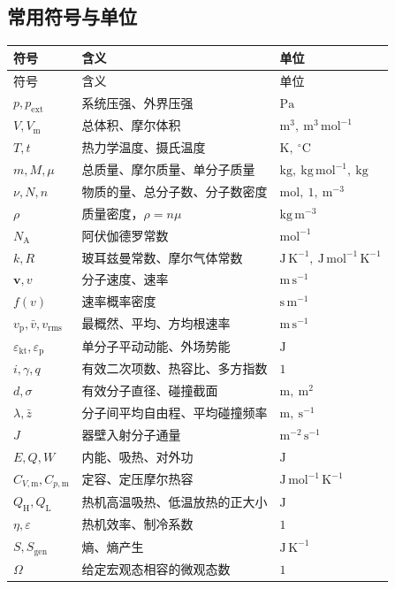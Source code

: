 \documentclass[UTF8,fontset=none,zihao=-4,a4paper]{ctexart}
\begin{document}
\subsection{常用符号与单位}
\small
\begin{longtable}{p{.17\linewidth} p{.47\linewidth} p{.24\linewidth}}
\toprule
符号 & 含义 & 单位\\
\midrule
\endfirsthead
\toprule
符号 & 含义 & 单位\\
\midrule
\endhead
\bottomrule
\endfoot
$p,p_{\mathrm{ext}}$ & 系统压强、外界压强 & $\mathrm{Pa}$\\
$V,V_{\mathrm m}$ & 总体积、摩尔体积 & $\mathrm{m^3},\ \mathrm{m^3\,mol^{-1}}$\\
$T,t$ & 热力学温度、摄氏温度 & $\mathrm K,\ {}^\circ\mathrm C$\\
$m,M,\mu$ & 总质量、摩尔质量、单分子质量 & $\mathrm{kg},\ \mathrm{kg\,mol^{-1}},\ \mathrm{kg}$\\
$\nu,N,n$ & 物质的量、总分子数、分子数密度 & $\mathrm{mol},\ 1,\ \mathrm{m^{-3}}$\\
$\rho$ & 质量密度，$\rho=n\mu$ & $\mathrm{kg\,m^{-3}}$\\
$N_{\mathrm A}$ & 阿伏伽德罗常数 & $\mathrm{mol^{-1}}$\\
$k,R$ & 玻耳兹曼常数、摩尔气体常数 & $\mathrm{J\,K^{-1}},\ \mathrm{J\,mol^{-1}\,K^{-1}}$\\
$\symbf v,v$ & 分子速度、速率 & $\mathrm{m\,s^{-1}}$\\
$f(v)$ & 速率概率密度 & $\mathrm{s\,m^{-1}}$\\
$v_{\mathrm p},\bar v,v_{\mathrm{rms}}$ & 最概然、平均、方均根速率 & $\mathrm{m\,s^{-1}}$\\
$\varepsilon_{\mathrm{kt}},\varepsilon_{\mathrm p}$ & 单分子平动动能、外场势能 & $\mathrm J$\\
$i,\gamma,q$ & 有效二次项数、热容比、多方指数 & $1$\\
$d,\sigma$ & 有效分子直径、碰撞截面 & $\mathrm m,\ \mathrm{m^2}$\\
$\lambda,\bar z$ & 分子间平均自由程、平均碰撞频率 & $\mathrm m,\ \mathrm{s^{-1}}$\\
$J$ & 器壁入射分子通量 & $\mathrm{m^{-2}\,s^{-1}}$\\
$E,Q,W$ & 内能、吸热、对外功 & $\mathrm J$\\
$C_{V,\mathrm m},C_{p,\mathrm m}$ & 定容、定压摩尔热容 & $\mathrm{J\,mol^{-1}\,K^{-1}}$\\
$Q_{\mathrm H},Q_{\mathrm L}$ & 热机高温吸热、低温放热的正大小 & $\mathrm J$\\
$\eta,\varepsilon$ & 热机效率、制冷系数 & $1$\\
$S,S_{\mathrm{gen}}$ & 熵、熵产生 & $\mathrm{J\,K^{-1}}$\\
$\Omega$ & 给定宏观态相容的微观态数 & $1$\\
\end{longtable}
\normalsize
\end{document}
